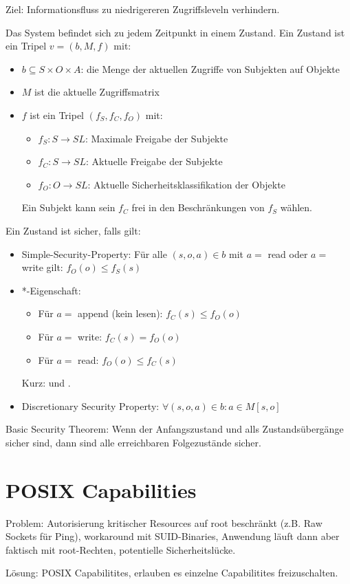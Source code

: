 \vspace{.3cm}

Ziel: Informationsfluss zu niedrigereren Zugriffsleveln verhindern.

\vspace{.3cm}

Das System befindet sich zu jedem Zeitpunkt in einem Zustand.
Ein Zustand ist ein Tripel $v = (b, M, f)$ mit:
\begin{itemize}
    \item $b \subseteq S \times O \times A$:
        die Menge der aktuellen Zugriffe von Subjekten auf Objekte
    \item $M$ ist die aktuelle Zugriffsmatrix
    \item $f$ ist ein Tripel $(f_S, f_C, f_O)$ mit:
        \begin{itemize}
            \item $f_S: S \to SL$: Maximale Freigabe der Subjekte
            \item $f_C: S \to SL$: Aktuelle Freigabe der Subjekte
            \item $f_O: O \to SL$: Aktuelle Sicherheitsklassifikation der Objekte
        \end{itemize}
        Ein Subjekt kann sein $f_C$ frei in den Beschränkungen von $f_S$ wählen.
\end{itemize}

Ein Zustand ist sicher, falls gilt:
\begin{itemize}
    \item Simple-Security-Property: Für alle $(s, o, a) \in b$ mit $a=$ read oder $a=$ write gilt:
        $f_O(o) \leq f_S(s)$
    \item *-Eigenschaft:
        \begin{itemize}
            \item Für $a=$ append (kein lesen): $f_C(s) \leq f_O(o)$
            \item Für $a=$ write: $f_C(s) = f_O(o)$
            \item Für $a=$ read: $f_O(o) \leq f_C(s)$
        \end{itemize}
        Kurz:  und .
    \item Discretionary Security Property: $\forall (s,o,a) \in b: a \in M[s,o]$
\end{itemize}

Basic Security Theorem: Wenn der Anfangszustand und alls Zustandsübergänge sicher sind, dann sind alle erreichbaren Folgezustände sicher.

\section{POSIX Capabilities}
Problem: Autorisierung kritischer Resources auf root beschränkt (z.B. Raw Sockets für Ping), workaround mit SUID-Binaries, Anwendung läuft dann aber faktisch mit root-Rechten, potentielle Sicherheitslücke.

\vspace{.3cm}
Lösung: POSIX Capabilitites, erlauben es einzelne Capabilitites freizuschalten.

